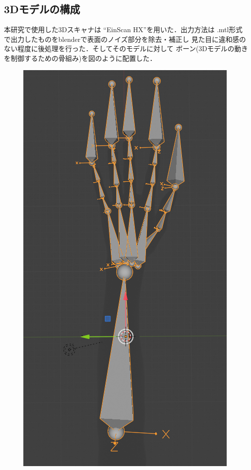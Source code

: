 \documentclass[11pt]{ltjsarticle}
\begin{document}
	\subsection{3Dモデルの構成}
		本研究で使用した3Dスキャナは ``EinScan HX''を用いた．出力方法は
		.mtl形式で出力したものをblenderで表面のノイズ部分を除去・補正し
		見た目に違和感のない程度に後処理を行った．そしてそのモデルに対して
		ボーン(3Dモデルの動きを制御するための骨組み)を図のように配置した．
		\begin{figure}[H]
		\centering
		\begin{minipage}{0.28\columnwidth}
		\centering
		\includegraphics[width = \columnwidth]{figs/handbone.png}

\end{minipage}
\end{figure}
\end{document}
